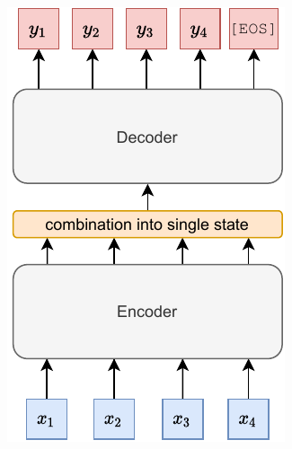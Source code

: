 \documentclass[bsc,deptreport,ai]{infthesis} %
\begin{document}
\begin{figure}[h]
\begin{subfigure}{.3\textwidth}
\includegraphics[width=.95\textwidth]{translation.pdf}
\caption{}
\end{subfigure}
\begin{subfigure}{.3\textwidth}
\centering

\end{subfigure}
\end{figure}
\end{document}
